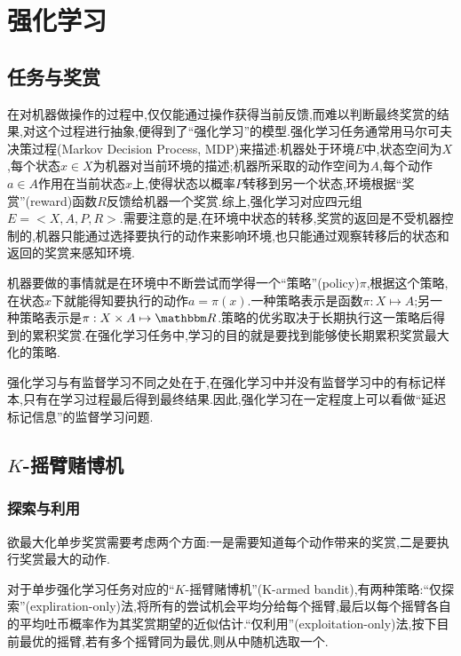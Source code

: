 \chapter{强化学习}

\section{任务与奖赏}

在对机器做操作的过程中,仅仅能通过操作获得当前反馈,而难以判断最终奖赏的结果,对这个过程进行抽象,便得到了``强化学习''的模型.强化学习任务通常用马尔可夫决策过程(Markov Decision Process, MDP)来描述:机器处于环境$E$中,状态空间为$X$,每个状态$x\in X$为机器对当前环境的描述;机器所采取的动作空间为$A$,每个动作$a\in A$作用在当前状态$x$上,使得状态以概率$P$转移到另一个状态,环境根据``奖赏''(reward)函数$R$反馈给机器一个奖赏.综上,强化学习对应四元组$E=<X,A,P,R>$.需要注意的是,在环境中状态的转移,奖赏的返回是不受机器控制的,机器只能通过选择要执行的动作来影响环境,也只能通过观察转移后的状态和返回的奖赏来感知环境.

机器要做的事情就是在环境中不断尝试而学得一个``策略''(policy)$\pi$,根据这个策略,在状态$x$下就能得知要执行的动作$a=\pi(x)$.一种策略表示是函数$\pi:X\mapsto A$;另一种策略表示是$\pi:X\times A\mapsto \mathbbm R$.策略的优劣取决于长期执行这一策略后得到的累积奖赏.在强化学习任务中,学习的目的就是要找到能够使长期累积奖赏最大化的策略.

强化学习与有监督学习不同之处在于,在强化学习中并没有监督学习中的有标记样本,只有在学习过程最后得到最终结果.因此,强化学习在一定程度上可以看做``延迟标记信息''的监督学习问题.

\section{$K$-摇臂赌博机}

\subsection{探索与利用}

欲最大化单步奖赏需要考虑两个方面:一是需要知道每个动作带来的奖赏,二是要执行奖赏最大的动作.

对于单步强化学习任务对应的``$K$-摇臂赌博机''(K-armed bandit),有两种策略:``仅探索''(expliration-only)法,将所有的尝试机会平均分给每个摇臂,最后以每个摇臂各自的平均吐币概率作为其奖赏期望的近似估计.``仅利用''(exploitation-only)法,按下目前最优的摇臂,若有多个摇臂同为最优,则从中随机选取一个.

